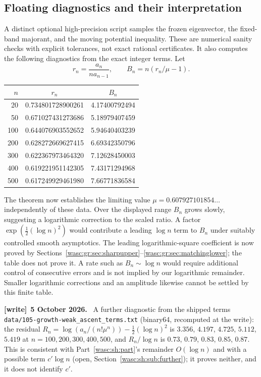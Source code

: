 \documentclass[11pt,a4paper]{article}
\newcommand{\file}[1]{\nolinkurl{#1}}
\theoremstyle{remark}\newtheorem{remark}[theorem]{Remark}
\numberwithin{equation}{section}
\newenvironment{writenote}[1][]{\par\smallskip\begingroup\small
 \noindent\textbf{[write]}\if\relax\detokenize{#1}\relax\else~\textbf{#1.}\fi\ }%
 {\par\endgroup\smallskip}
\begin{document}
\subsection{Floating diagnostics and their interpretation}
A distinct optional high-precision script samples the frozen eigenvector, the fixed-band majorant, and the moving potential inequality. These are numerical sanity checks with explicit tolerances, not exact rational certificates. It also computes the following diagnostics from the exact integer terms. Let
\[
r_n=\frac{a_n}{n a_{n-1}},\qquad
B_n=n(r_n/\mu-1).
\]
\begin{center}
\begin{tabular}{rcc}
\toprule
$n$ & $r_n$ & $B_n$\\
\midrule
20 & 0.734801728900261 & 4.17400792494\\
50 & 0.671027431273686 & 5.18979407459\\
100 & 0.644076903552652 & 5.94640403239\\
200 & 0.628272669627415 & 6.69342350796\\
300 & 0.622367973464320 & 7.12628450003\\
400 & 0.619221951142305 & 7.43171294968\\
500 & 0.617249929461980 & 7.66771836584\\
\bottomrule
\end{tabular}
\end{center}
The theorem now establishes the limiting value $\mu=0.607927101854\ldots$ independently of these data. Over the displayed range $B_n$ grows slowly, suggesting a logarithmic correction to the scaled ratio. A factor $\exp(\tfrac12(\log n)^2)$ would contribute a leading $\log n$ term to $B_n$ under suitably controlled smooth asymptotics. The leading logarithmic-square coefficient is now proved by Sections~\ref{wasc:gr:sec:sharpupper}--\ref{wasc:gr:sec:matchinglower}; the table does not prove it. A rate such as $B_n\sim\log n$ would require additional control of consecutive errors and is not implied by our logarithmic remainder. Smaller logarithmic corrections and an amplitude likewise cannot be settled by this finite table.
\begin{writenote}[5 October 2026]
A further diagnostic from the shipped terms \file{data/105-growth-weak_ascent_terms.txt} (binary64, recomputed at the write): the residual $R_n=\log(a_n/(n!\mu^n))-\frac12(\log n)^2$ is $3.356$, $4.197$, $4.725$, $5.112$, $5.419$ at $n=100,200,300,400,500$, and $R_n/\log n$ is $0.73$, $0.79$, $0.83$, $0.85$, $0.87$. This is consistent with Part~\ref{wasc:sh:part}'s remainder $O(\log n)$ and with a possible term $c'\log n$ (open, Section~\ref{wasc:sh:sub:further}); it proves neither, and it does not identify $c'$.
\end{writenote}
\end{document}
